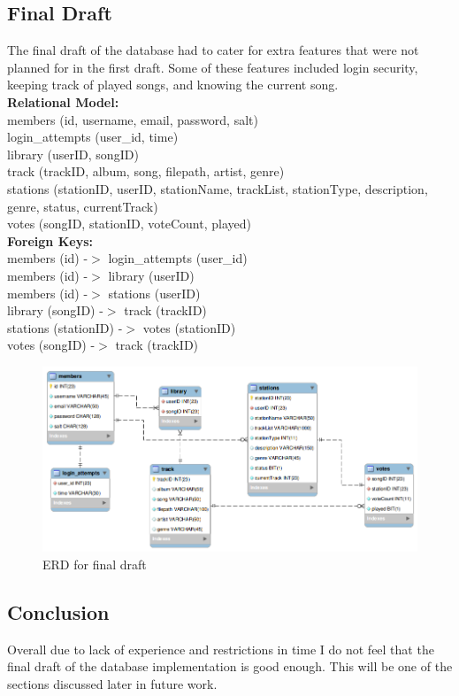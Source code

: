 \documentclass[a4paper, 12pt]{report}
\begin{document}
\subsection{Final Draft}
The final draft of the database had to cater for extra features that were not planned for in the first draft. Some of these features included login security, keeping track of played songs, and knowing the current song.\\
\textbf{Relational Model:}\\
members (id, username, email, password, salt)\\
login\_attempts (user\_id, time)\\
library (userID, songID)\\
track (trackID, album, song, filepath, artist, genre)\\
stations (stationID, userID, stationName, trackList, stationType, description, genre, status, currentTrack)\\
votes (songID, stationID, voteCount, played)\\
\textbf{Foreign Keys:}\\
members (id) -$>$ login\_attempts (user\_id)\\
members (id) -$>$ library (userID)\\
members (id) -$>$ stations (userID)\\
library (songID) -$>$ track (trackID)\\
stations (stationID) -$>$ votes (stationID)\\
votes (songID) -$>$ track (trackID)\\
\begin{figure}[H]
  \centering
    \includegraphics[width=1.0\textwidth]{screenshots/erd.png}
    \caption{ERD for final draft}
    \label{erd}
\end{figure}

\subsection{Conclusion}
Overall due to lack of experience and restrictions in time I do not feel that the final draft of the database implementation is good enough. This will be one of the sections discussed later in future work.
\end{document}
